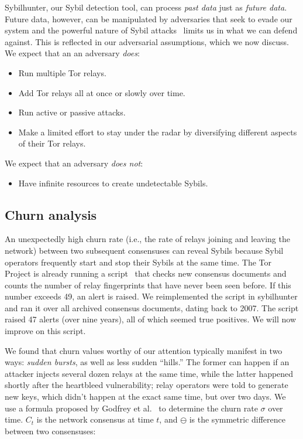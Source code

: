 Sybilhunter, our Sybil detection tool, can process \emph{past data} just as
\emph{future data}.  Future data, however, can be manipulated by adversaries
that seek to evade our system and the powerful nature of Sybil
attacks~\cite{Douceur2002a} limits us in what we can defend against.  This is
reflected in our adversarial assumptions, which we now discuss.  We expect that
an an adversary \emph{does}:
\begin{itemize}
	\item Run multiple Tor relays.

	\item Add Tor relays all at once or slowly over time.

	\item Run active or passive attacks.

	\item Make a limited effort to stay under the radar by diversifying
		different aspects of their Tor relays.
\end{itemize}

We expect that an adversary \emph{does not}:
\begin{itemize}
	\item Have infinite resources to create undetectable Sybils.
\end{itemize}

\subsection{Churn analysis}
An unexpectedly high churn rate (i.e., the rate of relays joining and leaving
the network) between two subsequent consensuses can reveal Sybils because Sybil
operators frequently start and stop their Sybils at the same time.  The Tor
Project is already running a script~\cite{doctor} that checks new consensus
documents and counts the number of relay fingerprints that have never been seen
before.  If this number exceeds 49, an alert is raised.  We reimplemented the
script in sybilhunter and ran it over all archived consensus documents, dating
back to 2007.  The script raised 47 alerts (over nine years), all of which
seemed true positives.  We will now improve on this script.


We found that churn values worthy of our attention typically manifest in two
ways: \emph{sudden bursts}, as well as less sudden ``hills.'' The former can
happen if an attacker injects several dozen relays at the same time, while the
latter happened shortly after the heartbleed vulnerability; relay operators
were told to generate new keys, which didn't happen at the exact same time, but
over two days.  We use a formula proposed by Godfrey et al.~\cite{Godfrey2006a}
to determine the churn rate $\sigma$ over time.  $C_{t}$ is the network
consensus at time $t$, and $\ominus$ is the symmetric difference between two
consensuses:

